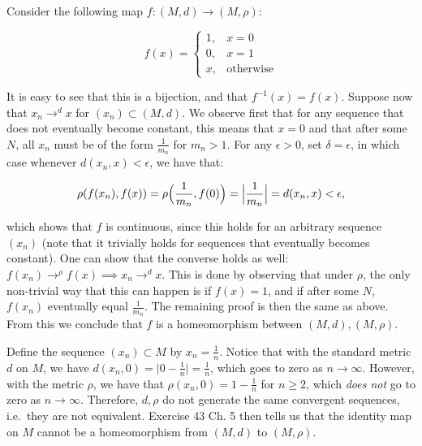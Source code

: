 \begin{solution}
    
    Consider the following map $f: (M, d) \rightarrow (M, \rho)$:
    
    \[f(x) = \begin{cases}
        1, & x = 0 \\
        0, & x = 1 \\
        x, & \text{otherwise}
    \end{cases}\]

    It is easy to see that this is a bijection, and that $f^{-1}(x) = f(x)$.
    Suppose now that $x_n \rightarrow^{d} x$ for $(x_n) \subset (M, d)$.
    We observe first that for any sequence that does not eventually become constant, this means that $x = 0$ and that after some $N$, all $x_n$ must be of the form $\frac{1}{m_n}$ for $m_n > 1$.
    For any $\epsilon > 0$, set $\delta = \epsilon$, in which case whenever $d(x_n, x) < \epsilon$, we have that:

    \[\rho(f(x_n), f(x)) = \rho\Bigl(\frac{1}{m_n}, f(0)\Bigr) = \Bigl\lvert \frac{1}{m_n} \Bigr\rvert = d(x_n, x) < \epsilon,\]

    which shows that $f$ is continuous, since this holds for an arbitrary sequence $(x_n)$ (note that it trivially holds for sequences that eventually becomes constant).
    One can show that the converse holds as well: $f(x_n) \rightarrow^{\rho} f(x) \implies x_n \rightarrow^{d} x$.
    This is done by observing that under $\rho$, the only non-trivial way that this can happen is if $f(x) = 1$, and if after some $N$, $f(x_n)$ eventually equal $\frac{1}{m_n}$.
    The remaining proof is then the same as above.
    From this we conclude that $f$ is a homeomorphism between $(M, d), (M, \rho)$.

    Define the sequence $(x_n) \subset M$ by $x_n = \frac{1}{n}$.
    Notice that with the standard metric $d$ on $M$, we have $d(x_n, 0) = \lvert 0 - \frac{1}{n} \rvert = \frac{1}{n}$, which goes to zero as $n \rightarrow \infty$.
    However, with the metric $\rho$, we have that $\rho(x_n, 0) = 1 - \frac{1}{n}$ for $n \geq 2$, which \textit{does not} go to zero as $n \rightarrow \infty$.
    Therefore, $d, \rho$ do not generate the same convergent sequences, i.e.\ they are not equivalent.
    Exercise 43 Ch. 5 then tells us that the identity map on $M$ cannot be a homeomorphism from $(M, d)$ to $(M, \rho)$.
\end{solution}

